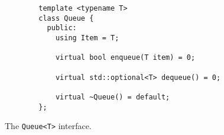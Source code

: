 \begin{figure}
    \begin{verbatim}
        template <typename T>
        class Queue {
          public:
            using Item = T;

            virtual bool enqueue(T item) = 0;

            virtual std::optional<T> dequeue() = 0;

            virtual ~Queue() = default;
        };
    \end{verbatim}
    \caption{The \texttt{Queue<T>} interface.}
    \label{fig:queue-interface}
\end{figure}
